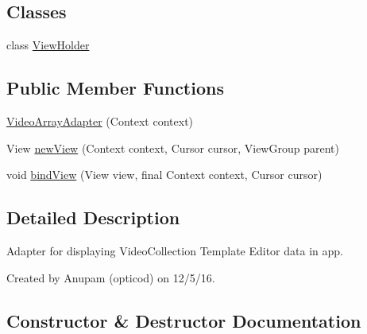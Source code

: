 \subsection*{Classes}
\begin{DoxyCompactItemize}
\item 
class \hyperlink{classorg_1_1buildmlearn_1_1videocollection_1_1adapter_1_1VideoArrayAdapter_1_1ViewHolder}{View\+Holder}
\end{DoxyCompactItemize}
\subsection*{Public Member Functions}
\begin{DoxyCompactItemize}
\item 
\hyperlink{classorg_1_1buildmlearn_1_1videocollection_1_1adapter_1_1VideoArrayAdapter_a25730c5408ccbca696998b1919b8c859}{Video\+Array\+Adapter} (Context context)
\item 
View \hyperlink{classorg_1_1buildmlearn_1_1videocollection_1_1adapter_1_1VideoArrayAdapter_adbc838e4fea94338e42c0837cdc50da0}{new\+View} (Context context, Cursor cursor, View\+Group parent)
\item 
void \hyperlink{classorg_1_1buildmlearn_1_1videocollection_1_1adapter_1_1VideoArrayAdapter_aa928d25ad6612e0e9e4e1340bf33842c}{bind\+View} (View view, final Context context, Cursor cursor)
\end{DoxyCompactItemize}


\subsection{Detailed Description}
Adapter for displaying Video\+Collection Template Editor data in app. 

Created by Anupam (opticod) on 12/5/16. 

\subsection{Constructor \& Destructor Documentation}
